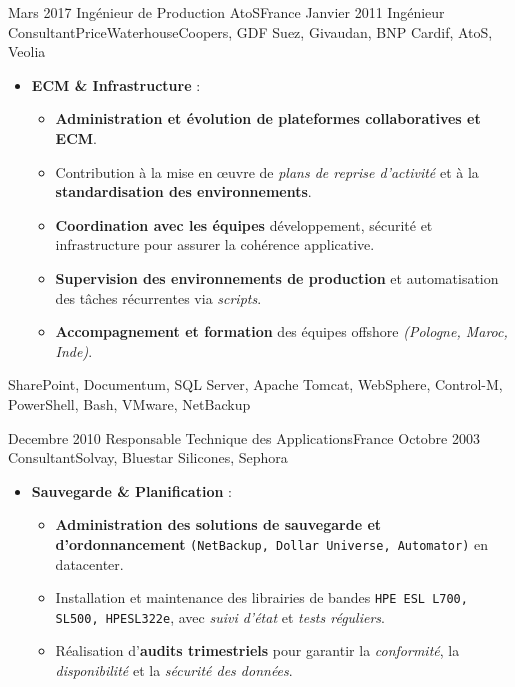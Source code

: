 \begin{experiences}
\emptySeparator
\emptySeparator

\consultantexperience
    {Mars 2017}       {Ingénieur de Production }{AtoS}{France}
    {Janvier 2011}    {Ingénieur Consultant}{PriceWaterhouseCoopers, GDF Suez, Givaudan, BNP Cardif, AtoS, Veolia} {
        \begin{itemize}[left=0pt,label={},itemsep=0.4em]
        \vspace{0.3em}  %
          \item \textbf{ECM \& Infrastructure} :
            \begin{itemize}[itemsep=0.15em,topsep=0.1em,parsep=0pt]
              \small
              \item \textbf{Administration et évolution de plateformes collaboratives et ECM}.
              \item Contribution à la mise en œuvre de \emph{plans de reprise d'activité} et à la \textbf{standardisation des environnements}.
              \item \textbf{Coordination avec les équipes} développement, sécurité et infrastructure pour assurer la cohérence applicative.
              \item \textbf{Supervision des environnements de production} et automatisation des tâches récurrentes via \emph{scripts}.
              \item \textbf{Accompagnement et formation} des équipes offshore \emph{(Pologne, Maroc, Inde)}.
            \end{itemize}
        \end{itemize}
        \vspace{0.3em}
    }
    {SharePoint, Documentum, SQL Server, Apache Tomcat, WebSphere, Control-M, PowerShell, Bash, VMware, NetBackup}
\emptySeparator


\consultantexperience
    {Decembre 2010} {Responsable Technique des Applications}{}{France}
    {Octobre 2003}    {Consultant}{Solvay, Bluestar Silicones, Sephora} {
        \begin{itemize}[left=0pt,label={},itemsep=0.5em]
        \vspace{0.3em}  %
          \item \textbf{Sauvegarde \& Planification} :
            \begin{itemize}[itemsep=0.2em,topsep=0.2em,parsep=0pt]
              \small
              \item \textbf{Administration des solutions de sauvegarde et d'ordonnancement} \texttt{(NetBackup, Dollar Universe, Automator)} en datacenter.
              \item Installation et maintenance des librairies de bandes \texttt{HPE ESL L700, SL500, HPESL322e}, avec \emph{suivi d'état} et \emph{tests réguliers}.
              \item Réalisation d'\textbf{audits trimestriels} pour garantir la \emph{conformité}, la \emph{disponibilité} et la \emph{sécurité des données}.
            \end{itemize}


\end{itemize}}
\end{experiences}
